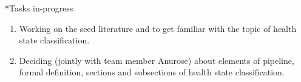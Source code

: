 \documentclass[11pt,a4paper]{article}
\begin{document}
\begin{section}
\begin{refsection}
       \begin{subsection}*{Tasks in-progress}
             \begin{enumerate}
                   \item Working on the seed literature \cite{DBLP:journals/tase/CamciC10} and \cite{DBLP:journals/eswa/KimTMC12} to get familiar with the topic of health state classification.
                   \item Deciding (jointly with team member Anurose) about elements of pipeline, formal definition, sections and subsections of health state classification.
             \end{enumerate}
       \end{subsection}

       \printbibliography
 \end{refsection}
\end{section}
\end{document}
